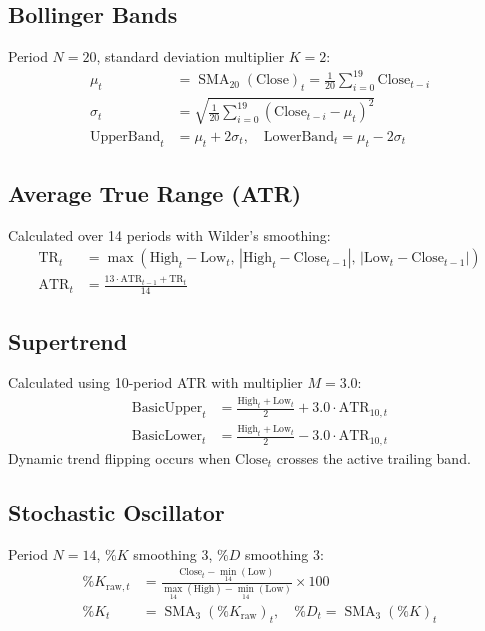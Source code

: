 \subsection{Bollinger Bands}
Period $N=20$, standard deviation multiplier $K=2$:
\begin{align}
    \mu_t &= \operatorname{SMA}_{20}(\mathrm{Close})_t = \frac{1}{20} \sum_{i=0}^{19} \mathrm{Close}_{t-i} \\
    \sigma_t &= \sqrt{\frac{1}{20} \sum_{i=0}^{19} (\mathrm{Close}_{t-i} - \mu_t)^2} \\
    \mathrm{UpperBand}_t &= \mu_t + 2\sigma_t, \quad \mathrm{LowerBand}_t = \mu_t - 2\sigma_t
\end{align}

\subsection{Average True Range (ATR)}
Calculated over 14 periods with Wilder's smoothing:
\begin{align}
    \mathrm{TR}_t &= \max\left( \mathrm{High}_t - \mathrm{Low}_t, \, |\mathrm{High}_t - \mathrm{Close}_{t-1}|, \, |\mathrm{Low}_t - \mathrm{Close}_{t-1}| \right) \\
    \mathrm{ATR}_t &= \frac{13 \cdot \mathrm{ATR}_{t-1} + \mathrm{TR}_t}{14}
\end{align}

\subsection{Supertrend}
Calculated using 10-period ATR with multiplier $M=3.0$:
\begin{align}
    \mathrm{BasicUpper}_t &= \frac{\mathrm{High}_t + \mathrm{Low}_t}{2} + 3.0 \cdot \mathrm{ATR}_{10, t} \\
    \mathrm{BasicLower}_t &= \frac{\mathrm{High}_t + \mathrm{Low}_t}{2} - 3.0 \cdot \mathrm{ATR}_{10, t}
\end{align}
Dynamic trend flipping occurs when $\mathrm{Close}_t$ crosses the active trailing band.

\subsection{Stochastic Oscillator}
Period $N=14$, $\%K$ smoothing 3, $\%D$ smoothing 3:
\begin{align}
    \%K_{\mathrm{raw}, t} &= \frac{\mathrm{Close}_t - \min_{14}(\mathrm{Low})}{\max_{14}(\mathrm{High}) - \min_{14}(\mathrm{Low})} \times 100 \\
    \%K_t &= \operatorname{SMA}_3(\%K_{\mathrm{raw}})_t, \quad \%D_t = \operatorname{SMA}_3(\%K)_t
\end{align}

